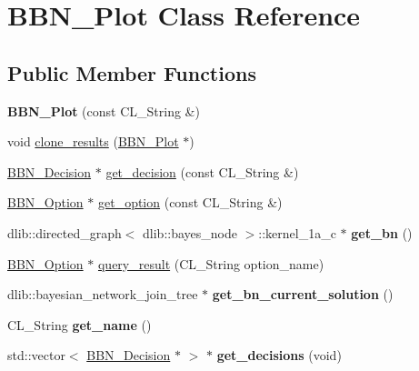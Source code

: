 \hypertarget{classBBN__Plot}{
\section{BBN\_\-Plot Class Reference}
\label{classBBN__Plot}
}
\subsection*{Public Member Functions}
\begin{DoxyCompactItemize}
\item 
\hypertarget{classBBN__Plot_af8bb0990fced989f7b3a28408e4d2d65}{
{\bfseries BBN\_\-Plot} (const CL\_\-String \&)}
\label{classBBN__Plot_af8bb0990fced989f7b3a28408e4d2d65}

\item 
void \hyperlink{classBBN__Plot_afbaf527d64694381a4e334b312cec999}{clone\_\-results} (\hyperlink{classBBN__Plot}{BBN\_\-Plot} $\ast$)
\item 
\hyperlink{classBBN__Decision}{BBN\_\-Decision} $\ast$ \hyperlink{classBBN__Plot_a2c1f680d40188bad93cec4474f171329}{get\_\-decision} (const CL\_\-String \&)
\item 
\hyperlink{classBBN__Option}{BBN\_\-Option} $\ast$ \hyperlink{classBBN__Plot_a9c9ac208b1d4558604e6ea46e90ceb6a}{get\_\-option} (const CL\_\-String \&)
\item 
\hypertarget{classBBN__Plot_a5733b2ec425b5e581553e7475de17867}{
dlib::directed\_\-graph$<$ dlib::bayes\_\-node $>$::kernel\_\-1a\_\-c $\ast$ {\bfseries get\_\-bn} ()}
\label{classBBN__Plot_a5733b2ec425b5e581553e7475de17867}

\item 
\hyperlink{classBBN__Option}{BBN\_\-Option} $\ast$ \hyperlink{classBBN__Plot_a85baec5f5adfc1e3b1e869c68a909538}{query\_\-result} (CL\_\-String option\_\-name)
\item 
\hypertarget{classBBN__Plot_ae2bb301d2284498bfd0485625b368c35}{
dlib::bayesian\_\-network\_\-join\_\-tree $\ast$ {\bfseries get\_\-bn\_\-current\_\-solution} ()}
\label{classBBN__Plot_ae2bb301d2284498bfd0485625b368c35}

\item 
\hypertarget{classBBN__Plot_ac34606d981a5c642bfdf353033588a0d}{
CL\_\-String {\bfseries get\_\-name} ()}
\label{classBBN__Plot_ac34606d981a5c642bfdf353033588a0d}

\item 
\hypertarget{classBBN__Plot_ad161d3dcd566b1bcc14dd67de6dc9892}{
std::vector$<$ \hyperlink{classBBN__Decision}{BBN\_\-Decision} $\ast$ $>$ $\ast$ {\bfseries get\_\-decisions} (void)}
\label{classBBN__Plot_ad161d3dcd566b1bcc14dd67de6dc9892}


\end{DoxyCompactItemize}
